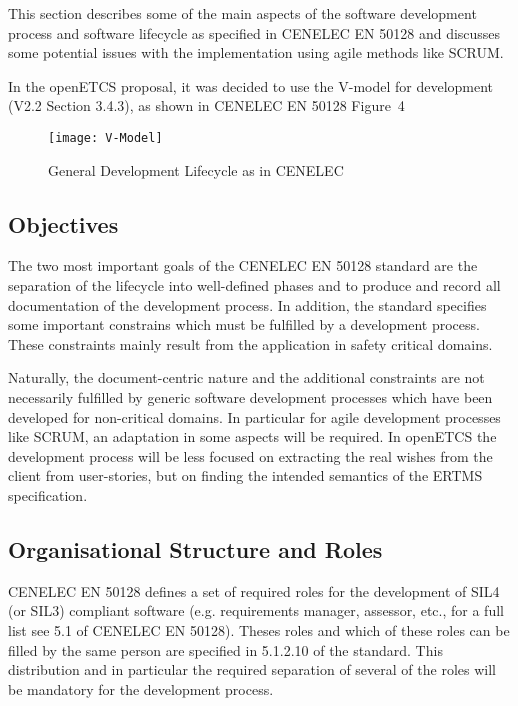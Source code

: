
This section describes some of the main aspects of the software development
process and software lifecycle as specified in CENELEC EN 50128 and discusses
some potential issues with the implementation using agile methods like SCRUM.

In the openETCS proposal, it was decided to use the V-model for development
(V2.2 Section 3.4.3), as shown in CENELEC EN 50128 Figure~4

\begin{figure}[ht]
  \centering
  \texttt{[image: V-Model]}
  \caption{General Development Lifecycle as in CENELEC}
  \label{fig:develop-lifecycle-cenelec}
\end{figure}

\subsection{Objectives}
\label{sec:objectives}

The two most important goals of the CENELEC EN 50128 standard are the separation
of the lifecycle into well-defined phases and to produce and record all
documentation of the development process. In addition, the standard specifies
some important constrains which must be fulfilled by a development
process. These constraints mainly result from the application in safety critical
domains.

Naturally, the document-centric nature and the additional constraints are not
necessarily fulfilled by generic software development processes which have been
developed for non-critical domains. In particular for agile development
processes like SCRUM, an adaptation in some aspects will be
required. In openETCS the development process will be less  focused on
extracting the real wishes from the client from user-stories, but on finding the
intended semantics of the ERTMS specification.

\subsection{Organisational Structure and Roles}
\label{sec:organ-struct-roles}

CENELEC EN 50128 defines a set of required roles for the development of SIL4 (or
SIL3) compliant software (e.g. requirements manager, assessor, etc., for a full
list see 5.1 of CENELEC EN 50128). Theses roles and which of these roles can be
filled by the same person are specified in 5.1.2.10 of the standard. This
distribution and in particular the required separation of several of the roles
will be mandatory for the development process.

